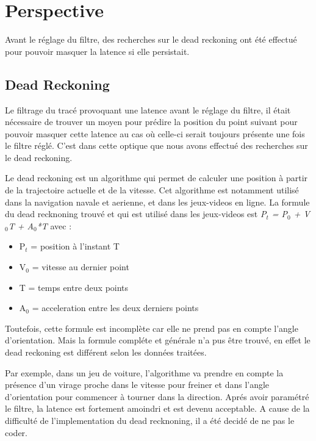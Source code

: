\chapter{Perspective}
Avant le réglage du filtre, des recherches sur le dead reckoning ont été effectué pour pouvoir masquer la latence si elle persistait.

\section{Dead Reckoning}

Le filtrage du tracé provoquant une latence avant le réglage du filtre, il était nécessaire de trouver un moyen pour prédire la position du point suivant pour pouvoir masquer cette latence au cas où celle-ci serait toujours présente une fois le filtre réglé. C'est dans cette optique que nous avons effectué des recherches sur le dead reckoning.

Le dead reckoning est un algorithme qui permet de calculer une position à partir de la trajectoire actuelle et de la vitesse. Cet algorithme est notamment utilisé dans la navigation navale et aerienne, et dans les jeux-videos en ligne. 
La formule du dead recknoning trouvé et qui est utilisé dans les jeux-videos  est \textit{P$_{t}$ = P$_{0}$ + V$_{0}$T + A$_{0}$*T} avec :

\begin{itemize}
	\item P$_{t}$ = position à l'instant T
	\item V$_{0}$ = vitesse au dernier point
	\item T = temps entre deux points
	\item A$_{0}$ = acceleration entre les deux derniers points
\end{itemize}

Toutefois, cette formule est incomplète car elle ne prend pas en compte l'angle d'orientation. Mais la formule compléte et générale n'a pus être trouvé, en effet le dead reckoning est différent selon les données traitées.

Par exemple, dans un jeu de voiture, l'algorithme va prendre en compte la présence d'un virage proche dans le vitesse pour freiner et dans l'angle d'orientation pour commencer à tourner dans la direction.
Aprés avoir paramétré le filtre, la latence est fortement amoindri et est devenu acceptable. A cause de la difficulté de l'implementation du dead recknoning, il a été decidé de ne pas le coder.

